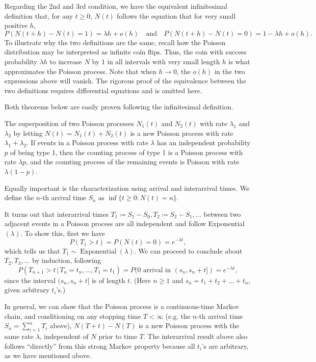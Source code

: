 \documentclass[11pt]{article}
\newcommand{\where}{\,|\,}
\begin{document}
Regarding the 2nd and 3rd condition, we have the equivalent infinitesimal definition that, for any $t\geq 0$, $N(t)$ follows the equation that for very small positive $h$, \[P(N(t+h)- N(t)=1)=\lambda h+o(h) \quad \text{and} \quad  P(N(t+h)- N(t)=0)=1- \lambda h+o(h).\]
To illustrate why the two definitions are the same, recall how the Poisson distribution may be interpreted as infinite coin flips. Thus, the coin with success probability $\lambda h$ to increase $N$ by 1 in all intervals with very small length $h$ is what approximates the Poisson process. Note that when $h\rightarrow 0$, the $o(h)$ in the two expressions above will vanish. The rigorous proof of the equivalence between the two definitions requires differential equations and is omitted here.

Both theorems below are easily proven following the infinitesimal definition. 

The superposition of two Poisson processes $N_{1}(t)$ and $N_{2}(t)$ with rate $\lambda _{1}$ and $\lambda _{2}$ by letting $N(t)=N_{1}(t)+N_{2}(t)$ is a new Poisson process with rate $\lambda _{1}+\lambda _{2}$. If events in a Poisson process with rate $\lambda $ has an independent probability $p$ of being type 1, then the counting process of type 1 is a Poisson process with rate $\lambda p$, and the counting process of the remaining events is Poisson with rate $\lambda (1- p)$.

Equally important is the characterization using arrival and interarrival times. We define the $n$-th arrival time $S_{n}$ as $\inf \{t\geq 0 : N(t)=n\}$.

It turns out that interarrival times $T_{1}\coloneqq S_{1}- S_{0},T_{2}\coloneqq S_{2}- S_{1},\dots $ between two adjacent events in a Poisson process are all independent and follow Exponential$(\lambda)$. To show this, first we have
\[
P(T_{1}>t)=P(N(t)=0)=e^{- \lambda t},
\]
which tells us that $T_{1}\sim \operatorname{Exponential}(\lambda)$. We can proceed to conclude about $T_{2},T_{3},\dots $ by induction, following
\[
P(T_{n+1}>t \where T_{n}=t_{n},\dots ,T_{1}=t_{1})=P(\text{0 arrival in } (s_{n},s_{n}+t])=e^{- \lambda t},
\]
since the interval $(s_{n},s_{n}+t]$ is of length $t$. (Here $n\geq 1$ and $s_{n}=t_{1}+t_{2}+\dots +t_{n}$, given arbitrary $t_{i}$’s.)

In general, we can show that the Poisson process is a continuous-time Markov chain, and conditioning on any stopping time $T<\infty $ (e.g. the $n$-th arrival time $S_{n}=\sum_{i=1}^{n}T_{i}$ above), $N(T+t)- N(T)$ is a new Poisson process with the same rate $\lambda$, independent of $N$ prior to time $T$. The interarrival result above also follows “directly” from this strong Markov property because all $t_{i}$’s are arbitrary, as we have mentioned above.
\end{document}
